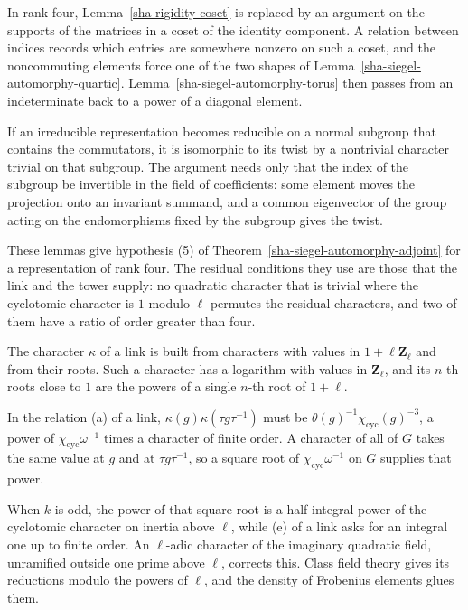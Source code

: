 In rank four, Lemma~\ref{sha-rigidity-coset} is replaced by an argument on the supports of the matrices in a coset of the identity component. A relation between indices records which entries are somewhere nonzero on such a coset, and the noncommuting elements force one of the two shapes of Lemma~\ref{sha-siegel-automorphy-quartic}. Lemma~\ref{sha-siegel-automorphy-torus} then passes from an indeterminate back to a power of a diagonal element.

If an irreducible representation becomes reducible on a normal subgroup that contains the commutators, it is isomorphic to its twist by a nontrivial character trivial on that subgroup. The argument needs only that the index of the subgroup be invertible in the field of coefficients: some element moves the projection onto an invariant summand, and a common eigenvector of the group acting on the endomorphisms fixed by the subgroup gives the twist.

These lemmas give hypothesis (5) of Theorem~\ref{sha-siegel-automorphy-adjoint} for a representation of rank four. The residual conditions they use are those that the link and the tower supply: no quadratic character that is trivial where the cyclotomic character is $1$ modulo $\ell$ permutes the residual characters, and two of them have a ratio of order greater than four.

The character $\kappa$ of a link is built from characters with values in $1+\ell\mathbf Z_\ell$ and from their roots. Such a character has a logarithm with values in $\mathbf Z_\ell$, and its $n$-th roots close to $1$ are the powers of a single $n$-th root of $1+\ell$.

In the relation (a) of a link, $\kappa(g)\kappa(\tau g\tau^{-1})$ must be $\theta(g)^{-1}\chi_{\mathrm{cyc}}(g)^{-3}$, a power of $\chi_{\mathrm{cyc}}\omega^{-1}$ times a character of finite order. A character of all of $G$ takes the same value at $g$ and at $\tau g\tau^{-1}$, so a square root of $\chi_{\mathrm{cyc}}\omega^{-1}$ on $G$ supplies that power.

When $k$ is odd, the power of that square root is a half-integral power of the cyclotomic character on inertia above $\ell$, while (e) of a link asks for an integral one up to finite order. An $\ell$-adic character of the imaginary quadratic field, unramified outside one prime above $\ell$, corrects this. Class field theory gives its reductions modulo the powers of $\ell$, and the density of Frobenius elements glues them.

